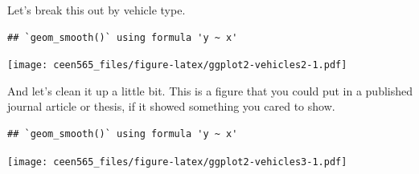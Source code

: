 \documentclass[
]{book}
\begin{document}
Let's break this out by vehicle type.

\begin{verbatim}
## `geom_smooth()` using formula 'y ~ x'
\end{verbatim}

\texttt{[image: ceen565\_files/figure-latex/ggplot2-vehicles2-1.pdf]}

And let's clean it up a little bit. This is a figure that you could put in a
published journal article or thesis, if it showed something you cared to show.

\begin{verbatim}
## `geom_smooth()` using formula 'y ~ x'
\end{verbatim}

\texttt{[image: ceen565\_files/figure-latex/ggplot2-vehicles3-1.pdf]}

  
\end{document}
